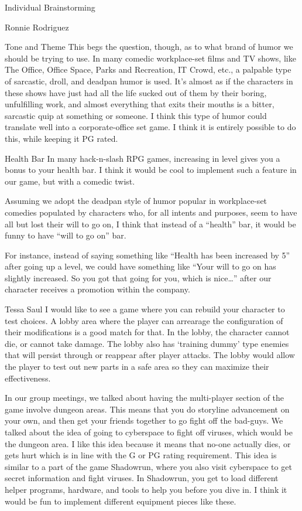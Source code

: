 \documentclass[12pt]{report}
\begin{document}
\begin{section}{Individual Brainstorming}
\begin{subsection}{Ronnie Rodriguez}
\begin{subsubsection}{Tone and Theme}
This begs the question, though, as to what brand of humor we should be
trying to use. In many comedic workplace-set films and TV shows, like The
Office, Office Space, Parks and Recreation, IT Crowd, etc., a palpable type
of sarcastic, droll, and deadpan humor is used. It's almost as if the
characters in these shows have just had all the life sucked out of them by
their boring, unfulfilling work, and almost everything that exits their
mouths is a bitter, sarcastic quip at something or someone. I think this
type of humor could translate well into a corporate-office set game. I
think it is entirely possible to do this, while keeping it PG rated. 
\end{subsubsection}

\begin{subsubsection}{Health Bar}
In many hack-n-slash RPG games, increasing in level gives you a bonus to 
your health bar. I think it would be cool to implement such a feature in
our game, but with a comedic twist. 

Assuming we adopt the deadpan style of humor popular in workplace-set
comedies populated by characters who, for all intents and purposes, seem to
have all but lost their will to go on, I think that instead of a ``health''
bar, it would be funny to have ``will to go on'' bar. 

For instance, instead of saying something like ``Health has been increased
by 5'' after going up a level, we could have something like ``Your will to
go on has slightly increased. So you got that going for you, which is
nice\ldots'' after our character receives a promotion within the company.
\end{subsubsection}
\end{subsection}

\begin{subsection}{Tessa Saul}
I would like to see a game where you can rebuild your character to test
choices. A lobby area where the player can arrearage the configuration of
their modifications is a good match for that. In the lobby, the character
cannot die, or cannot take damage. The lobby also has `training dummy' type 
enemies that will persist through or reappear after player attacks. The
lobby would allow the player to test out new parts in a safe area so they
can maximize their effectiveness.

In our group meetings, we talked about having the multi-player section of
the game involve dungeon areas. This means that you do storyline advancement
on your own, and then get your friends together to go fight off the
bad-guys. We talked about the idea of going to cyberspace to fight off
viruses, which would be the dungeon area. I like this idea because it means
that no-one actually dies, or gets hurt which is in line with the G or PG 
rating requirement. This idea is similar to a part of the game Shadowrun,
where you also visit cyberspace to get secret information and fight viruses.
In Shadowrun, you get to load different helper programs, hardware, and tools
to help you before you dive in. I think it would be fun to implement
different equipment pieces like these. 


\end{subsection}
\end{section}
\end{document}
